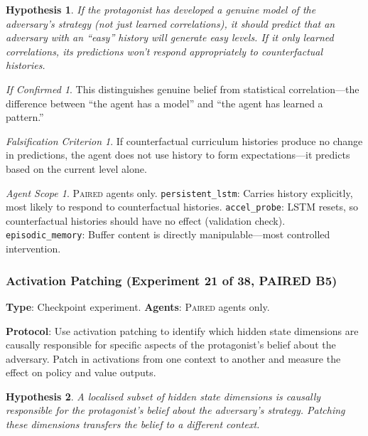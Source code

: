 \documentclass[11pt,a4paper]{article}
\newtheorem{hypothesis}{Hypothesis}[subsection]
\theoremstyle{remark}
\newtheorem*{falsification}{Falsification Criterion}
\newtheorem*{implication}{If Confirmed}
\newtheorem*{agentscope}{Agent Scope}
\newcommand{\paired}{\textsc{Paired}}
\begin{document}
\begin{hypothesis}
If the protagonist has developed a genuine model of the adversary's strategy (not just learned correlations), it should predict that an adversary with an ``easy'' history will generate easy levels. If it only learned correlations, its predictions won't respond appropriately to counterfactual histories.
\end{hypothesis}

\begin{implication}
This distinguishes genuine belief from statistical correlation---the difference between ``the agent has a model'' and ``the agent has learned a pattern.''
\end{implication}

\begin{falsification}
If counterfactual curriculum histories produce no change in predictions, the agent does not use history to form expectations---it predicts based on the current level alone.
\end{falsification}

\begin{agentscope}
\paired{} agents only. \texttt{persistent\_lstm}: Carries history explicitly, most likely to respond to counterfactual histories. \texttt{accel\_probe}: LSTM resets, so counterfactual histories should have no effect (validation check). \texttt{episodic\_memory}: Buffer content is directly manipulable---most controlled intervention.
\end{agentscope}

\subsubsection{Activation Patching (Experiment 21 of 38, PAIRED B5)}
\label{exp:activation_patching}

\textbf{Type}: Checkpoint experiment. \textbf{Agents}: \paired{} agents only.

\textbf{Protocol}: Use activation patching to identify which hidden state dimensions are causally responsible for specific aspects of the protagonist's belief about the adversary. Patch in activations from one context to another and measure the effect on policy and value outputs.

\begin{hypothesis}
A localised subset of hidden state dimensions is causally responsible for the protagonist's belief about the adversary's strategy. Patching these dimensions transfers the belief to a different context.
\end{hypothesis}
\end{document}
